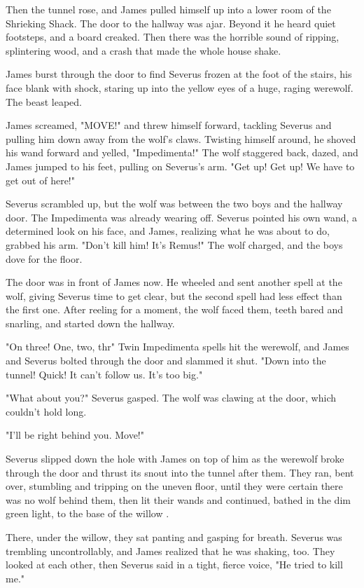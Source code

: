 Then the tunnel rose, and James pulled himself up into a lower room of the Shrieking Shack. The door to the hallway was ajar. Beyond it he heard quiet footsteps, and a board creaked. Then there was the horrible sound of ripping, splintering wood, and a crash that made the whole house shake.

James burst through the door to find Severus frozen at the foot of the stairs, his face blank with shock, staring up into the yellow eyes of a huge, raging werewolf. The beast leaped.

James screamed, "MOVE!" and threw himself forward, tackling Severus and pulling him down away from the wolf's claws. Twisting himself around, he shoved his wand forward and yelled, "Impedimenta!" The wolf staggered back, dazed, and James jumped to his feet, pulling on Severus's arm. "Get up! Get up! We have to get out of here!"

Severus scrambled up, but the wolf was between the two boys and the hallway door. The Impedimenta was already wearing off. Severus pointed his own wand, a determined look on his face, and James, realizing what he was about to do, grabbed his arm. "Don't kill him! It's Remus!" The wolf charged, and the boys dove for the floor.

The door was in front of James now. He wheeled and sent another spell at the wolf, giving Severus time to get clear, but the second spell had less effect than the first one. After reeling for a moment, the wolf faced them, teeth bared and snarling, and started down the hallway.

"On three! One, two, thr{\el}" Twin Impedimenta spells hit the werewolf, and James and Severus bolted through the door and slammed it shut. "Down into the tunnel! Quick! It can't follow us. It's too big."

"What about you?" Severus gasped. The wolf was clawing at the door, which couldn't hold long.

"I'll be right behind you. Move!"

Severus slipped down the hole with James on top of him as the werewolf broke through the door and thrust its snout into the tunnel after them. They ran, bent over, stumbling and tripping on the uneven floor, until they were certain there was no wolf behind them, then lit their wands and continued, bathed in the dim green light, to the base of the willow .

There, under the willow, they sat panting and gasping for breath. Severus was trembling uncontrollably, and James realized that he was shaking, too. They looked at each other, then Severus said in a tight, fierce voice, "He tried to kill me."

